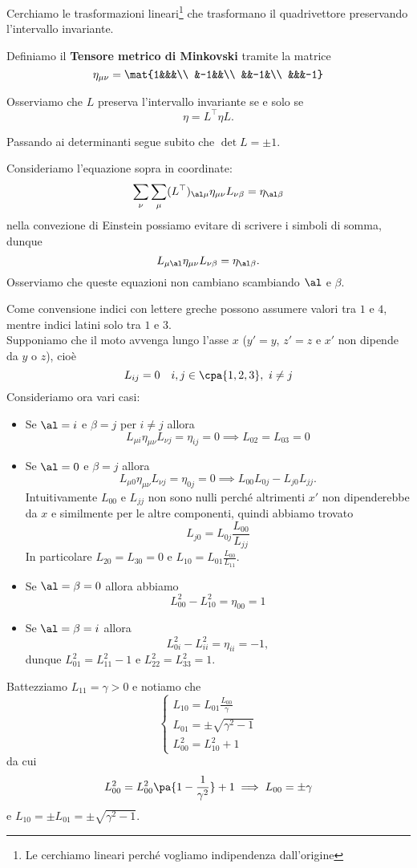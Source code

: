 Cerchiamo le trasformazioni lineari\footnote{Le cerchiamo lineari perch\'e vogliamo indipendenza dall'origine} che trasformano il quadrivettore preservando l'intervallo invariante.

\begin{definition}
Definiamo il \textbf{Tensore metrico di Minkovski} tramite la matrice
\[\eta_{\mu\nu}=\mat{1&&&\\
&-1&&\\
&&-1&\\
&&&-1}\]
\end{definition}
\noindent
Osserviamo che $L$ preserva l'intervallo invariante se e solo se
\[\eta=L^\top\eta L.\]
\begin{remark}
Passando ai determinanti segue subito che $\det L=\pm 1$.
\end{remark}


\noindent Consideriamo l'equazione sopra in coordinate:
\[\sum_\nu\sum_\mu(L^\top)_{\al\mu}\eta_{\mu\nu}L_{\nu\beta}=\eta_{\al\beta}\]
nella convezione di Einstein possiamo evitare di scrivere i simboli di somma, dunque
\[L_{\mu\al}\eta_{\mu\nu}L_{\nu\beta}=\eta_{\al\beta}.\]
Osserviamo che queste equazioni non cambiano scambiando $\al$ e $\beta$.

Come convensione indici con lettere greche possono assumere valori tra $1$ e $4$, mentre indici latini solo tra $1$ e $3$.\\
Supponiamo che il moto avvenga lungo l'asse $x$ ($y'=y$, $z'=z$ e $x'$ non dipende da $y$ o $z$), cio\`e
\[L_{ij}=0 \quad i,j\in\cpa{1,2,3},\ i\neq j\]
Consideriamo ora vari casi:
\begin{itemize}
\item Se $\al=i$ e $\beta=j$ per $i\neq j$ allora
\[L_{\mu i}\eta_{\mu\nu}L_{\nu j}=\eta_{ij}=0\implies L_{02}=L_{03}=0\]
\item Se $\al=0$ e $\beta=j$ allora
\[L_{\mu0}\eta_{\mu\nu}L_{\nu j}=\eta_{0j}=0\implies L_{00}L_{0j}-L_{j0}L_{jj}.\]
Intuitivamente $L_{00}$ e $L_{jj}$ non sono nulli perch\'e altrimenti $x'$ non dipenderebbe da $x$ e similmente per le altre componenti, quindi abbiamo trovato
\[L_{j0}=L_{0j}\frac{L_{00}}{L_{jj}}\]
In particolare $L_{20}=L_{30}=0$ e $L_{10}=L_{01}\frac{L_{00}}{L_{11}}$.
\item Se $\al=\beta=0$ allora abbiamo
\[L_{00}^2-L_{10}^2=\eta_{00}=1\]
\item Se $\al=\beta=i$ allora
\[L_{0i}^2-L_{ii}^2=\eta_{ii}=-1,\]
dunque $L_{01}^2=L_{11}^2-1$ e $L_{22}^2=L_{33}^2=1$.
\end{itemize}
\noindent
Battezziamo $L_{11}=\gamma>0$ e notiamo che
\[\begin{cases}
L_{10}=L_{01}\frac{L_{00}}{\gamma}\\
L_{01}=\pm\sqrt{\gamma^2-1}\\
L^2_{00}=L^2_{10}+1
\end{cases}\]
da cui
\[L_{00}^2=L_{00}^2\pa{1-\frac1{\gamma^2}}+1\implies L_{00}=\pm\gamma\]
e $L_{10}=\pm L_{01}=\pm \sqrt{\gamma^2-1}$.
\medskip

